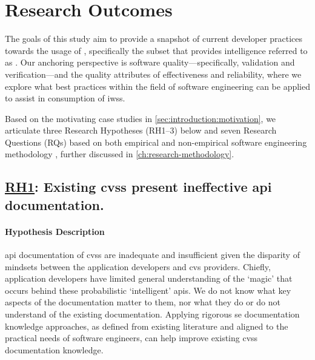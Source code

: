 \section{Research Outcomes}
\label{sec:introduction:hypohtesis}

The goals of this study aim to provide a snapshot of current developer practices towards the usage of , specifically the subset that provides  intelligence referred to as . Our anchoring perspective is software quality---specifically, validation and verification---and the quality attributes of effectiveness and reliability, where we explore  what best practices within the field of software engineering can be applied to assist in consumption of \glspl{iws}.

\ifdefined\review\else\begin{framed}\ifdefined\review\else\end{framed}\fi

Based on the motivating case studies in \cref{sec:introduction:motivation}, we articulate three Research Hypotheses (RH1--3) below and seven Research Questions (RQs) based on  both empirical and non-empirical software engineering methodology \citep{Shull:2007vh,Simon:1996uw}, further discussed in \cref{ch:research-methodology}.

\newcommand{\rh}[1]{\hyperref[rh#1]{RH#1}}
\subsection[Research Hypothesis 1]{\underline{RH1}: Existing \glspl{cvs} present ineffective \gls{api} documentation.}
\label{rh1}

\paragraph{Hypothesis Description}
\gls{api} documentation of \glspl{cvs} are inadequate and insufficient given the disparity of mindsets between the application developers and \gls{cvs} providers. Chiefly, application developers have limited general understanding of the `magic' that occurs behind these probabilistic `intelligent' \glspl{api}. We do not know what key aspects of the documentation matter to them, nor what they do or do not understand of the existing documentation. Applying rigorous \gls{se} documentation knowledge approaches, as defined from existing literature and aligned to the practical needs of software engineers, can help improve existing \glspl{cvs} documentation knowledge.

